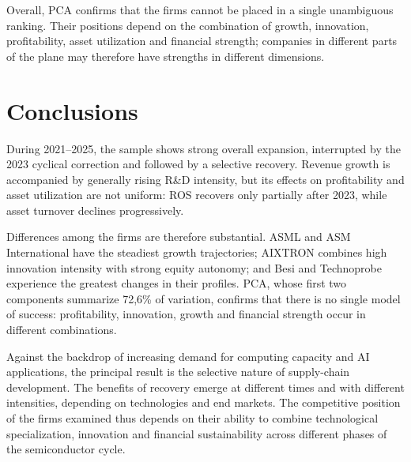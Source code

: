 \documentclass[11pt,a4paper]{article}
\begin{document}
Overall, PCA confirms that the firms cannot be placed in a single unambiguous ranking. Their positions depend on the combination of growth, innovation, profitability, asset utilization and financial strength; companies in different parts of the plane may therefore have strengths in different dimensions.

\section{Conclusions}

During 2021--2025, the sample shows strong overall expansion, interrupted by the 2023 cyclical correction and followed by a selective recovery. Revenue growth is accompanied by generally rising R\&D intensity, but its effects on profitability and asset utilization are not uniform: ROS recovers only partially after 2023, while asset turnover declines progressively.

Differences among the firms are therefore substantial. ASML and ASM International have the steadiest growth trajectories; AIXTRON combines high innovation intensity with strong equity autonomy; and Besi and Technoprobe experience the greatest changes in their profiles. PCA, whose first two components summarize 72,6\% of variation, confirms that there is no single model of success: profitability, innovation, growth and financial strength occur in different combinations.

Against the backdrop of increasing demand for computing capacity and AI applications, the principal result is the selective nature of supply-chain development. The benefits of recovery emerge at different times and with different intensities, depending on technologies and end markets. The competitive position of the firms examined thus depends on their ability to combine technological specialization, innovation and financial sustainability across different phases of the semiconductor cycle.
\end{document}
